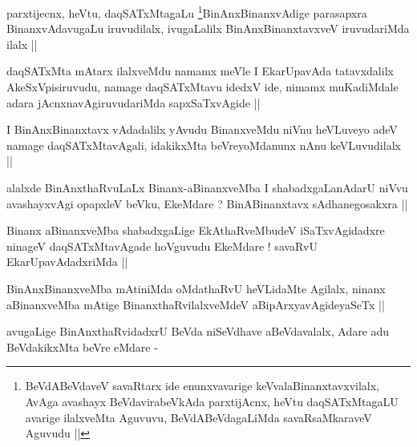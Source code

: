 \begin{artha}
  parxtijecnx, heVtu, daqSATxMtagaLu \footnote[2]{BeVdABeVdaveV
    savaRtarx ide enunxvavarige keVvalaBinanxtavxvilalx, AvAga
    avashayx BeVdavirabeVkAda parxtijAcnx, heVtu daqSATxMtagaLU
    avarige ilalxveMta Aguvuvu, BeVdABeVdagaLiMda savaRsaMkaraveV
    Aguvudu ||}BinAnxBinanxvAdige
  parasapxra BinanxvAdavugaLu iruvudilalx, ivugaLalilx
  BinAnxBinanxtavxveV iruvudariMda ilalx ||
\end{artha}

\begin{artha}
daqSATxMta mAtarx ilalxveMdu namamx meVle I EkarUpavAda tatavxdalilx
AkeSxVpisiruvudu, namage daqSATxMtavu idedxV ide, nimamx muKadiMdale
adara jAcnxnavAgiruvudariMda sapxSaTxvAgide ||
\end{artha}


\begin{artha}
I BinAnxBinanxtavx vAdadalilx yAvudu BinanxveMdu niVnu heVLuveyo adeV
namage daqSATxMtavAgali, idakikxMta beVreyoMdanunx nAnu keVLuvudilalx ||
\end{artha}


\begin{artha}
alalxde BinAnxthaRvuLaLx Binanx-aBinanxveMba I shabadxgaLanAdarU niVvu
avashayxvAgi opapxleV beVku, EkeMdare ? BinABinanxtavx sAdhanegosakxra ||
\end{artha}


\begin{artha}
Binanx aBinanxveMba shabadxgaLige EkAthaRveMbudeV iSaTxvAgidadxre
ninageV daqSATxMtavAgade hoVguvudu EkeMdare ! savaRvU
EkarUpavAdadxriMda ||
\end{artha}


\begin{artha}
BinAnxBinanxveMba mAtiniMda oMdathaRvU heVLidaMte Agilalx, ninanx
aBinanxveMba mAtige BinanxthaRvilalxveMdeV aBipArxyavAgideyaSeTx ||
\end{artha}

\begin{artha}
avugaLige BinAnxthaRvidadxrU BeVda niSeVdhave aBeVdavalalx, Adare adu
BeVdakikxMta beVre eMdare -
\end{artha}

